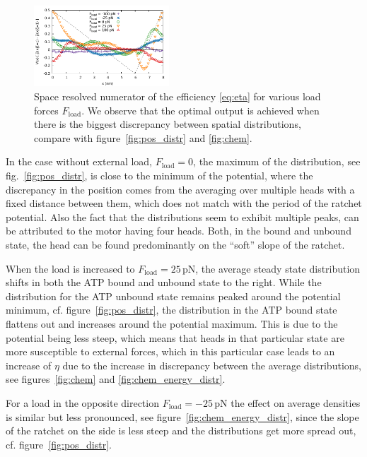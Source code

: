 \documentclass[aps,pre,twocolumn,showpacs,showkeys,superscriptaddress,floatfix]{revtex4-1}
\begin{document}
\begin{figure}[t]
\centering
\includegraphics[width=0.45\textwidth,height=!]{chem_efficiency_distr_all_F}
\caption{
\label{fig:chem_efficiency_distr}
Space resolved numerator of the efficiency \eqref{eq:eta} for various load forces $F_\text{load}$. 
We observe that the optimal output is achieved when there is the biggest discrepancy between spatial distributions, compare with figure~\ref{fig:pos_distr} and \ref{fig:chem}. 
}
\end{figure}

In the case without external load, $F_\text{load}=0$, 
the maximum of the distribution, see fig.~\ref{fig:pos_distr}, is close to the minimum of the potential,  
where the discrepancy in the position comes from the averaging over multiple heads with a fixed distance between them, 
which does not match with the period of the ratchet potential. 
Also the fact that the distributions seem to exhibit multiple peaks, can be attributed to the motor having four heads. 
Both, in the bound and unbound state, the head can be found predominantly on the ``soft'' slope of the ratchet.

When the load is increased to $F_\text{load} = 25 \, \mathrm{pN}$, the average steady state distribution shifts in both the ATP bound and unbound state to the right. 
While the distribution for the ATP unbound state remains peaked around the potential minimum, cf. figure~\ref{fig:pos_distr},
the distribution in the ATP bound state flattens out and increases around the potential maximum. 
This is due to the potential being less steep, which means that heads in that particular state are more susceptible to external forces,  
which in this particular case leads to an increase of $\eta$ due to the increase in discrepancy between the average distributions, 
see figures~\ref{fig:chem} and \ref{fig:chem_energy_distr}. 

For a load in the opposite direction $F_\text{load}= -25 \, \mathrm{pN}$ the effect on average densities is similar but less pronounced, 
see figure~\ref{fig:chem_energy_distr}, 
since the slope of the ratchet on the side is less steep and the distributions get more spread out, cf. figure~\ref{fig:pos_distr}. 
\end{document}
